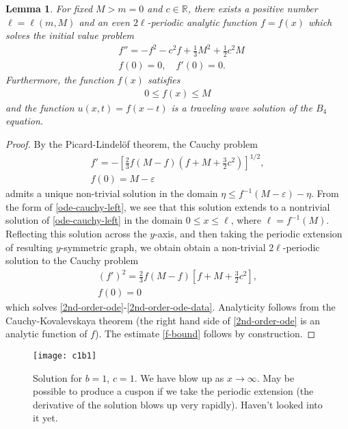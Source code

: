 \documentclass[12pt,reqno]{amsart}
\numberwithin{equation}{section}  %
\newcommand{\rr}{\mathbb{R}}
\newcommand{\ee}{\varepsilon}
\newtheorem{lemma}[theorem]{Lemma}
\begin{document}
%
%
%
%
%
%                
%
%
%
%
\begin{lemma}
  For fixed $M > m = 0$ and $c \in \rr$,  there exists a positive
  number $\ell = \ell(m, M)$ and an even $2\ell$-periodic analytic function $f =
  f(x)$ which solves the initial value problem
\begin{align}
  \label{2nd-order-ode}
  & f'' = -f^{2} - c^{2} f + \frac{1}{3} M^{2} + \frac{1}{2}c^{2} M
\\
\label{2nd-order-ode-data}
& f(0)=0, \quad f'(0) = 0.
\end{align}
Furthermore, the function
  $f(x)$ satisfies
  \begin{equation}
    \label{f-bound}
  \begin{split}
  0 \le f(x) \le M
  \end{split}
  \end{equation}
  and the function $u(x,t) = f(x-t)$ is a traveling wave solution of the
  $B_{4}$ equation. 
\label{lem:ode-solution}
\end{lemma}
%
%
%
\begin{proof}
By the Picard-Lindel\"of theorem, the Cauchy problem
\begin{gather}
  \label{ode-cauchy-left}
   f'
  = -\left [ \frac{2}{3} f
  \left( M -f \right )
  \left ( f +M + \frac{3}{2}c^{2}\right ) \right
  ]^{1/2},
  \\
\label{ode-cauchy-data-left}
f(0) = M-\ee
\end{gather}
admits a unique non-trivial solution in the domain $\eta \le f^{-1}(M- \ee) - \eta$.
From the form of \eqref{ode-cauchy-left}, we see that this solution extends to a
nontrivial solution of \eqref{ode-cauchy-left} in the domain $0 \le x \le \ell$,
where $\ell = f^{-1}(M)$. Reflecting this solution across the $y$-axis, and then
taking the periodic extension of resulting $y$-symmetric graph, we obtain 
obtain a non-trivial $2\ell$-periodic
solution to the Cauchy problem
\begin{gather}
  (f')^{2}
  = \frac{2}{3} f
  \left( M -f \right )
  \left [ f +M + \frac{3}{2}c^{2}  \right ],
  \\
   f(0) =0
\end{gather}
which solves 
\eqref{2nd-order-ode}-\eqref{2nd-order-ode-data}. Analyticity follows from the
Cauchy-Kovalevskaya theorem (the right hand side of \eqref{2nd-order-ode} is an
analytic function of $f$). The
estimate \eqref{f-bound} follows by construction.
%
%
\end{proof}
%
\newpage
%
\begin{figure}[h!]
  \caption{Solution for $b=1$, $c=1$. We have blow up as $x \to \infty$. May be
  possible to produce a cuspon if we take the periodic extension (the derivative
  of the solution blows up very rapidly). Haven't looked
  into it yet.}
    \texttt{[image: c1b1]}
\end{figure}
\end{document}
